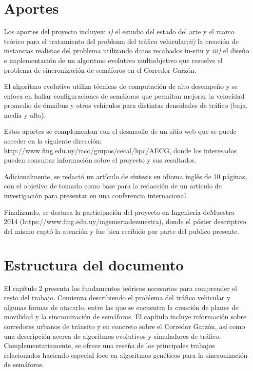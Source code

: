 \section{Aportes}
Los aportes del proyecto incluyen: \textit{i)} el estudio del estado del arte y el marco teórico para el tratamiento del problema del tráfico vehicular;\textit{ii)} la creación de instancias realistas del problema utilizando datos recabados in-situ y \textit{iii)} el diseño e implementación de un algoritmo evolutivo multiobjetivo que resuelve el problema de sincronización de semáforos en el Corredor Garzón. 

El algoritmo evolutivo utiliza técnicas de computación de alto desempeño y se enfoca en hallar configuraciones de semáforos que permitan mejorar la velocidad promedio de ómnibus y otros vehículos para distintas densidades de tráfico (baja, media y alta). 

Estos aportes se complementan con el desarrollo de un sitio web que se puede acceder en la siguiente dirección: \url{http://www.fing.edu.uy/inco/grupos/cecal/hpc/AECG}, donde los interesados pueden consultar información sobre el proyecto y sus resultados. 

Adicionalmente, se redactó un artículo de síntesis en idioma inglés de 10 páginas, con el objetivo de tomarlo como base para la redacción de un artículo de investigación para presentar en una conferencia internacional. 

Finalizando, se destaca la participación del proyecto en Ingeniería deMuestra 2014 (https://www.fing.edu.uy/ingenieriademuestra), donde el póster descriptivo del mismo captó la atención y fue bien recibido por parte del publico presente.



\section{Estructura del documento}
El capítulo 2 presenta los fundamentos teóricos necesarios para comprender el resto del trabajo. Comienza describiendo el problema del tráfico vehicular y algunas formas de atacarlo, entre las que se encuentra la creación de planes de movilidad y la sincronización de semáforos. El capítulo incluye información sobre corredores urbanos de tránsito y en concreto sobre el Corredor Garzón, así como una descripción acerca de algoritmos evolutivos y simuladores de tráfico. Complementariamente, se ofrece una reseña de los principales trabajos relacionados haciendo especial foco en algoritmos genéticos para la sincronización de semáforos.

